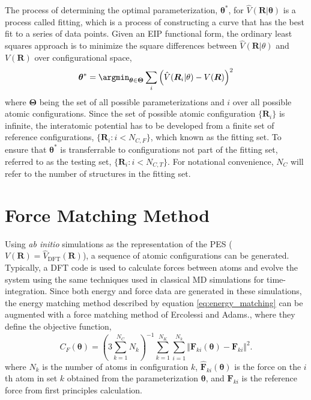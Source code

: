 The process of determining the optimal parameterization, $\bm{\theta}^*$, for $\hat{V}(\bm{R}|\bm{\theta})$ is a process called fitting, which is a process of constructing a curve that has the best fit to a series of data points.  Given an EIP functional form,  the ordinary least squares approach is to minimize the square differences between $\hat{V}(\bm{R}|\theta)$ and $V(\bm{R})$ over configurational space,
\begin{equation}
\label{eq:energy_matching}
	\bm{\theta}^*
		= \argmin_{\bm{\theta}\in\bm{\Theta}}
					\sum_i \left(\hat{V}(\bm{R}_i|\theta) - V(\bm{R})\right)^2
\end{equation}
where $\bm{\Theta}$ being the set of all possible parameterizations and $i$ over all possible atomic configurations.  Since the set of possible atomic configuration $\{\bm{R}_i\}$ is infinite, the interatomic potential has to be developed from a finite set of reference configurations, $\{\bm{R}_i:i<N_{C,F}\}$, which known as the fitting set.  To ensure that $\bm{\theta}^*$ is transferrable to configurations not part of the fitting set, referred to as the testing set, $\{\bm{R}_i:i<N_{C,T}\}$.  For notational convenience, $N_C$ will refer to the number of structures in the fitting set.

\section{Force Matching Method}
Using \emph{ab initio} simulations as the representation of the PES ($V(\bm{R})=\hat{V}_{\text{DFT}}(\bm{R})$), a sequence of atomic configurations can be generated.  Typically, a DFT code is used to calculate forces between atoms and evolve the system using the same techniques used in classical MD simulations for time-integration.   Since both energy and force data are generated in these simulations, the energy matching method described by equation \ref{eq:energy_matching} can be augmented with a force matching method of Ercolessi and Adams.\cite{ercolessi1994_fitting_forcematching}, where they define the objective function,
\begin{equation}
\label{eq:force_matching}
	C_{F}(\bm{\theta}) = \left(3\sum_{k=1}^{N_C} N_k \right)^{-1}
		\sum_{k=1}^{N_K}\sum_{i=1}^{N_k}
			\Vert \hat{\bm{F}}_{ki}(\bm{\theta}) - \bm{F}_{ki}\Vert^2.
\end{equation}
where $N_k$ is the number of atoms in configuration $k$, $\hat{\bm{F}}_{ki}(\bm{\theta})$ is the force on the $i$th atom in set $k$ obtained from the parameterization $\bm{\theta}$, and $\bm{F}_{ki}$ is the reference force from first principles calculation.

